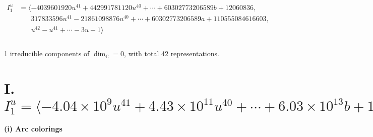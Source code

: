 \documentclass[1p]{elsarticle_modified}
\theoremstyle{definition}
\begin{document}
\begin{align*}
I^u_{1}&=\langle 
-4039601920 u^{41}+442991781120 u^{40}+\cdots+60302773206589 b+12060836,\\
\phantom{I^u_{1}}&\phantom{= \langle  }317833596 u^{41}-21861098876 u^{40}+\cdots+60302773206589 a+110555084616603,\\
\phantom{I^u_{1}}&\phantom{= \langle  }u^{42}- u^{41}+\cdots-3 u+1\rangle \\
\\
\end{align*}
\raggedright * 1 irreducible components of $\dim_{\mathbb{C}}=0$, with total 42 representations.\\
\newpage
\renewcommand{\arraystretch}{1}
\centering \section*{I. $I^u_{1}= \langle -4.04\times10^{9} u^{41}+4.43\times10^{11} u^{40}+\cdots+6.03\times10^{13} b+1.21\times10^{7},\;3.18\times10^{8} u^{41}-2.19\times10^{10} u^{40}+\cdots+6.03\times10^{13} a+1.11\times10^{14},\;u^{42}- u^{41}+\cdots-3 u+1 \rangle$}
\flushleft \textbf{(i) Arc colorings}\\
\end{document}
